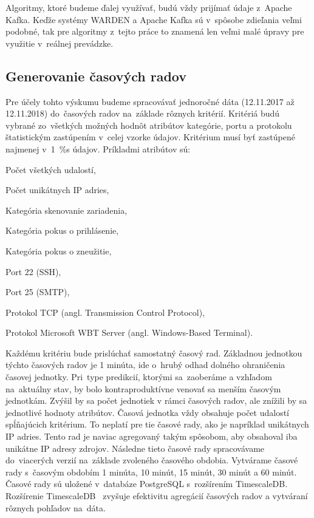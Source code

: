 \documentclass[thesismargins, thesislinespacing, openright, upjsfrontpage]{rnthesis}
\begin{document}
Algoritmy, ktoré budeme ďalej využívať, budú vždy prijímať údaje z~Apache Kafka. Keďže systémy WARDEN a Apache Kafka sú v~spôsobe zdieľania veľmi podobné, tak pre algoritmy z~tejto práce to znamená len veľmi malé úpravy pre využitie v~reálnej prevádzke.

\subsection{Generovanie časových radov}

Pre účely tohto výskumu budeme spracovávať jednoročné dáta (12.11.2017 až 12.11.2018) do~časových radov na~základe rôznych kritérií. Kritériá budú vybrané zo~všetkých možných hodnôt atribútov kategórie, portu a protokolu štatistickým zastúpením v~celej vzorke údajov. Kritérium musí byť zastúpené najmenej v~1~\%s údajov. Príkladmi atribútov sú: 
\begin{compactenum}
    \item Počet všetkých udalostí,
    \item Počet unikátnych IP adries,
    \item Kategória skenovanie zariadenia,
    \item Kategória pokus o prihlásenie,
    \item Kategória pokus o zneužitie,
    \item Port 22 (SSH),
    \item Port 25 (SMTP),
    \item Protokol TCP (angl. Transmission Control Protocol),
    \item Protokol Microsoft WBT Server (angl. Windows-Based Terminal).
\end{compactenum}

Každému kritériu bude prislúchať samostatný časový rad. Základnou jednotkou týchto časových radov je 1 minúta, ide o~hrubý odhad dolného ohraničenia časovej jednotky. Pri~type predikcií, ktorými sa~zaoberáme a vzhľadom na~aktuálny stav, by bolo kontraproduktívne venovať sa menším časovým jednotkám. Zvýšil by sa počet jednotiek v rámci časových radov, ale znížili by sa jednotlivé hodnoty atribútov. Časová jednotka vždy obsahuje počet udalostí spĺňajúcich kritérium. To neplatí pre tie časové rady, ako je napríklad unikátnych IP adries. Tento rad je naviac agregovaný takým spôsobom, aby obsahoval iba unikátne IP adresy zdrojov. Následne tieto časové rady spracovávame do~viacerých verzií na~základe zvoleného časového obdobia. Vytvárame časové rady s~časovým obdobím 1 minúta, 10 minút, 15 minút, 30 minút a 60 minút. Časové rady sú uložené v~databáze PostgreSQL s~rozšírením TimescaleDB. Rozšírenie TimescaleDB~\cite{timescaledb2020postgresql} zvyšuje efektivitu agregácií časových radov a vytváraní rôznych pohľadov na~dáta.
\end{document}
